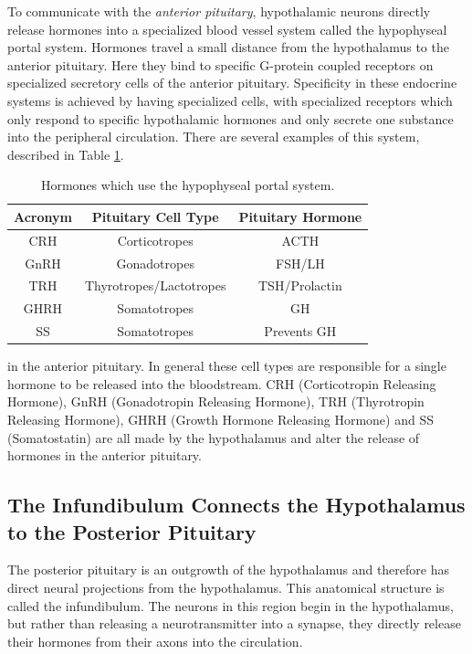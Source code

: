 \documentclass{tufte-handout}
\begin{document}
To communicate with the \emph{anterior pituitary}, hypothalamic neurons directly release hormones into a specialized blood vessel system called the hypophyseal portal system.  Hormones travel a small distance from the hypothalamus to the anterior pituitary.  Here they bind to specific G-protein coupled receptors on specialized secretory cells of the anterior pituitary.  Specificity in these endocrine systems is achieved by having specialized cells, with specialized receptors which only respond to specific hypothalamic hormones and only secrete one substance into the peripheral circulation.  There are several examples of this system, described in Table \ref{tab:anterior-pituitary-hormones}.

\begin{table}
  \centering
  \begin{tabular}{ccc}
    \toprule
    Acronym & Pituitary Cell Type & Pituitary Hormone \\
    \midrule
    CRH & Corticotropes & ACTH \\
    GnRH & Gonadotropes & FSH/LH\\
    TRH& Thyrotropes/Lactotropes & TSH/Prolactin \\
    GHRH & Somatotropes & GH \\
    SS & Somatotropes & Prevents GH \\
    \bottomrule
  \end{tabular}
  \caption{Hormones which use the hypophyseal portal system.}
  \label{tab:anterior-pituitary-hormones}
\end{table}

 in the anterior pituitary.  In general these cell types are responsible for a single hormone to be released into the bloodstream.  CRH (Corticotropin Releasing Hormone), GnRH (Gonadotropin Releasing Hormone), TRH (Thyrotropin Releasing Hormone), GHRH (Growth Hormone Releasing Hormone) and SS (Somatostatin) are all made by the hypothalamus and alter the release of hormones in the anterior pituitary.  

\subsection{The Infundibulum Connects the Hypothalamus to the Posterior Pituitary}

The posterior pituitary is an outgrowth of the hypothalamus and therefore has direct neural projections from the hypothalamus.  This anatomical structure is called the infundibulum. The neurons in this region begin in the hypothalamus, but rather than releasing a neurotransmitter into a synapse, they directly release their hormones from their axons into the circulation.
\end{document}
